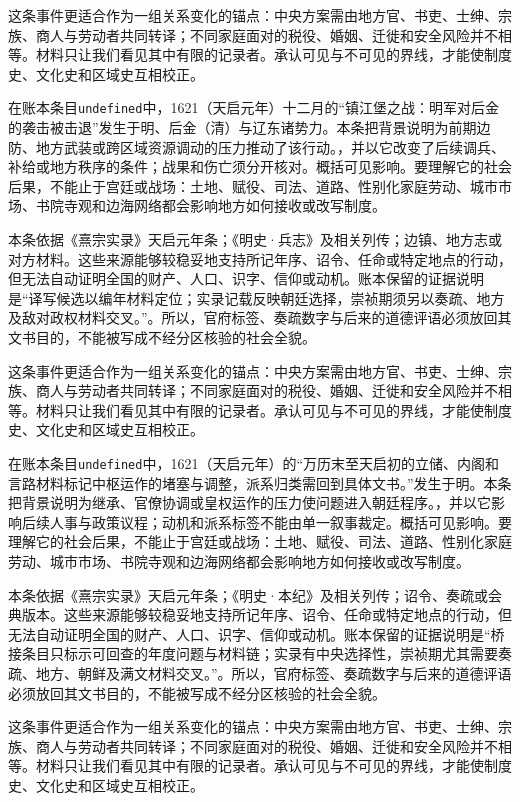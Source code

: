 这条事件更适合作为一组关系变化的锚点：中央方案需由地方官、书吏、士绅、宗族、商人与劳动者共同转译；不同家庭面对的税役、婚姻、迁徙和安全风险并不相等。材料只让我们看见其中有限的记录者。承认可见与不可见的界线，才能使制度史、文化史和区域史互相校正。

在账本条目\texttt{undefined}中，1621（天启元年）十二月的“镇江堡之战：明军对后金的袭击被击退”发生于明、后金（清）与辽东诸势力。本条把背景说明为前期边防、地方武装或跨区域资源调动的压力推动了该行动。，并以它改变了后续调兵、补给或地方秩序的条件；战果和伤亡须分开核对。概括可见影响。要理解它的社会后果，不能止于宫廷或战场：土地、赋役、司法、道路、性别化家庭劳动、城市市场、书院寺观和边海网络都会影响地方如何接收或改写制度。

本条依据《熹宗实录》天启元年条；《明史·兵志》及相关列传；边镇、地方志或对方材料。这些来源能够较稳妥地支持所记年序、诏令、任命或特定地点的行动，但无法自动证明全国的财产、人口、识字、信仰或动机。账本保留的证据说明是“译写候选以编年材料定位；实录记载反映朝廷选择，崇祯期须另以奏疏、地方及敌对政权材料交叉。”。所以，官府标签、奏疏数字与后来的道德评语必须放回其文书目的，不能被写成不经分区核验的社会全貌。

这条事件更适合作为一组关系变化的锚点：中央方案需由地方官、书吏、士绅、宗族、商人与劳动者共同转译；不同家庭面对的税役、婚姻、迁徙和安全风险并不相等。材料只让我们看见其中有限的记录者。承认可见与不可见的界线，才能使制度史、文化史和区域史互相校正。

在账本条目\texttt{undefined}中，1621（天启元年）的“万历末至天启初的立储、内阁和言路材料标记中枢运作的堵塞与调整，派系归类需回到具体文书。”发生于明。本条把背景说明为继承、官僚协调或皇权运作的压力使问题进入朝廷程序。，并以它影响后续人事与政策议程；动机和派系标签不能由单一叙事裁定。概括可见影响。要理解它的社会后果，不能止于宫廷或战场：土地、赋役、司法、道路、性别化家庭劳动、城市市场、书院寺观和边海网络都会影响地方如何接收或改写制度。

本条依据《熹宗实录》天启元年条；《明史·本纪》及相关列传；诏令、奏疏或会典版本。这些来源能够较稳妥地支持所记年序、诏令、任命或特定地点的行动，但无法自动证明全国的财产、人口、识字、信仰或动机。账本保留的证据说明是“桥接条目只标示可回查的年度问题与材料链；实录有中央选择性，崇祯期尤其需要奏疏、地方、朝鲜及满文材料交叉。”。所以，官府标签、奏疏数字与后来的道德评语必须放回其文书目的，不能被写成不经分区核验的社会全貌。

这条事件更适合作为一组关系变化的锚点：中央方案需由地方官、书吏、士绅、宗族、商人与劳动者共同转译；不同家庭面对的税役、婚姻、迁徙和安全风险并不相等。材料只让我们看见其中有限的记录者。承认可见与不可见的界线，才能使制度史、文化史和区域史互相校正。

